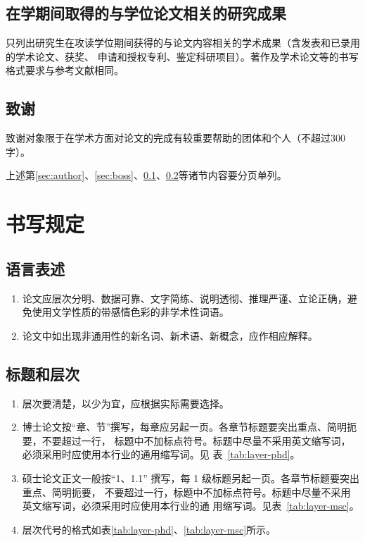 \subsection{在学期间取得的与学位论文相关的研究成果}
\label{sec:pub}

只列出研究生在攻读学位期间获得的与论文内容相关的学术成果（含发表和已录用的学术论文、获奖、
申请和授权专利、鉴定科研项目）。著作及学术论文等的书写格式要求与参考文献相同。

\subsection{致谢}
\label{sec:ack}

致谢对象限于在学术方面对论文的完成有较重要帮助的团体和个人（不超过300 字）。

上述第\ref{sec:author}、\ref{sec:boss}、\ref{sec:pub}、\ref{sec:ack}等诸节内容要分页单列。

\section{书写规定}
\label{sec:writing}

\subsection{语言表述}
\label{sec:expression}

\begin{enumerate}
\item 论文应层次分明、数据可靠、文字简练、说明透彻、推理严谨、立论正确，避免使用文学性质的带感情色彩的非学术性词语。
\item 论文中如出现非通用性的新名词、新术语、新概念，应作相应解释。
\end{enumerate}

\subsection{标题和层次}
\label{sec:layer}

\begin{enumerate}
\item 层次要清楚，以少为宜，应根据实际需要选择。
\item 博士论文按“章、节”撰写，每章应另起一页。各章节标题要突出重点、简明扼要，不要超过一行，
  标题中不加标点符号。标题中尽量不采用英文缩写词，必须采用时应使用本行业的通用缩写词。见
  表~\ref{tab:layer-phd}。
\item 硕士论文正文一般按“1、1.1” 撰写，每 1 级标题另起一页。各章节标题要突出重点、简明扼要，
  不要超过一行，标题中不加标点符号。标题中尽量不采用英文缩写词，必须采用时应使用本行业的通
  用缩写词。见表~\ref{tab:layer-msc}。
\item 层次代号的格式如表\ref{tab:layer-phd}、\ref{tab:layer-msc}所示。
\end{enumerate}

